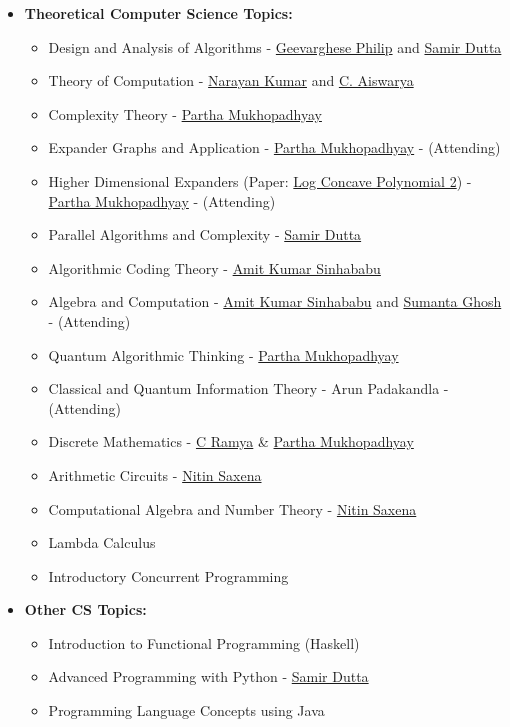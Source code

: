 \documentclass[10pt,a4paper,sans,colorlinks]{moderncv}        %
\begin{document}
\begin{itemize}
\begin{itemize}
\item \textbf{Theoretical Computer Science Topics:} \begin{itemize}
\item Design and Analysis of Algorithms - \href{https://www.cmi.ac.in/~gphilip/}{Geevarghese Philip} and \href{https://www.cmi.ac.in/~sdatta/}{Samir Dutta}
\item Theory of Computation - \href{https://www.cmi.ac.in/~kumar/}{Narayan Kumar} and \href{https://www.cmi.ac.in/~aiswarya/}{C. Aiswarya}
\item Complexity Theory - \href{https://www.cmi.ac.in/~partham/}{Partha Mukhopadhyay}
\item Expander Graphs and Application - \href{https://www.cmi.ac.in/~partham/}{Partha Mukhopadhyay} - (Attending)
\item Higher Dimensional Expanders (Paper: \href{https://arxiv.org/abs/1811.01816}{Log Concave Polynomial 2}) - \href{https://www.cmi.ac.in/~partham/}{Partha Mukhopadhyay} - (Attending)
\item Parallel Algorithms and Complexity - \href{https://www.cmi.ac.in/~sdatta/}{Samir Dutta}
\item Algorithmic Coding Theory - \href{https://www.cmi.ac.in/people/fac-profile.php?id=amitks}{Amit Kumar Sinhababu}
\item Algebra and Computation - \href{https://www.cmi.ac.in/people/fac-profile.php?id=amitks}{Amit Kumar Sinhababu} and \href{https://sites.google.com/view/sumghosh/home}{Sumanta Ghosh} - (Attending)
\item Quantum Algorithmic Thinking - \href{https://www.cmi.ac.in/~partham/}{Partha Mukhopadhyay}
\item Classical and Quantum Information Theory - Arun Padakandla - (Attending)
\item Discrete Mathematics - \href{https://sites.google.com/cse.iitm.ac.in/c-ramya}{C Ramya} \& \href{https://www.cmi.ac.in/~partham/}{Partha Mukhopadhyay}
\item Arithmetic Circuits - \href{https://www.cse.iitk.ac.in/users/nitin/}{Nitin Saxena}
\item Computational Algebra and Number Theory - \href{https://www.cse.iitk.ac.in/users/nitin/}{Nitin Saxena}
\item Lambda Calculus
\item Introductory Concurrent Programming
		            \end{itemize}
		            \vspace*{5mm}
		      \item \textbf{Other CS Topics:} \begin{itemize}
			            \item Introduction to Functional Programming (Haskell)
			            \item Advanced Programming with Python - \href{https://www.cmi.ac.in/~sdatta/}{Samir Dutta}
			            \item Programming Language Concepts using Java
		            \end{itemize}


\end{itemize}
\end{itemize}
\end{document}
